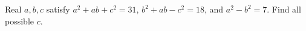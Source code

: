 Real $ a,b,c $ satisfy $ a^2+ab+c^2=31 $, $ b^2+ab-c^2=18 $, and $ a^2-b^2=7 $. Find all possible $ c $.
